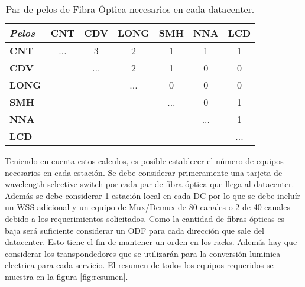 \begin{table}[!hbt]
\begin{center}
\begin{tabular}{||l | c  c  c  c  c  c||}
\hline
\hline
 \textbf{\textit{Pelos}}& \textbf{CNT} & \textbf{CDV} & \textbf{LONG} & \textbf{SMH} & \textbf{NNA} & \textbf{LCD}  \\
\hline
\textbf{CNT} & ... & 3 & 2 & 1 & 1 & 1\\
\hline
\textbf{CDV} &  & ... & 2 & 1 & 0 & 0\\
\hline
\textbf{LONG} &  &  & ... & 0 & 0 & 0\\
\hline
\textbf{SMH} &  &  &  & ... & 0 & 1\\
\hline
\textbf{NNA} & & & & & ... & 1\\
\hline
\textbf{LCD} & & & & & & ... \\
\hline
\end{tabular}
  \caption[Fibras de cada DataCenter]{Par de pelos de Fibra Óptica necesarios en cada datacenter.}
\end{center}
\end{table}


Teniendo en cuenta estos calculos, es posible establecer el número de equipos necesarios en cada estación. Se debe considerar primeramente una tarjeta de wavelength selective switch por cada par de fibra óptica que llega al datacenter. Además se debe considerar 1 estación local en cada DC por lo que se debe incluír un WSS adicional y un equipo de Mux/Demux de 80 canales o 2 de 40 canales debido a los requerimientos solicitados. Como la cantidad de fibras ópticas es baja será suficiente considerar un ODF para cada dirección que sale del datacenter. Esto tiene el fin de mantener un orden en los racks. Además hay que considerar los transpondedores que se utilizarán para la conversión luminica-electrica para cada servicio. El resumen de todos los equipos requeridos se muestra en la figura \ref{fig:resumen}.

